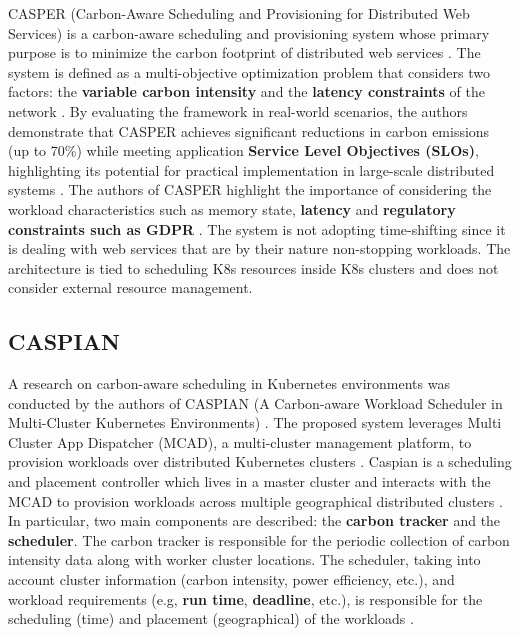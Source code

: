 CASPER (Carbon-Aware Scheduling and Provisioning for Distributed Web Services) is a carbon-aware scheduling and provisioning system whose primary purpose is to minimize the carbon footprint of distributed web services \cite{Souza_2023}.
The system is defined as a multi-objective optimization problem that considers two factors: the \textbf{variable carbon intensity} and the \textbf{latency constraints} of the network \cite{Souza_2023}.
By evaluating the framework in real-world scenarios, the authors demonstrate that CASPER achieves significant reductions in carbon emissions (up to 70\%) while meeting application \textbf{Service Level Objectives (SLOs)}, highlighting its potential for practical implementation in large-scale distributed systems \cite{Souza_2023}.
The authors of CASPER highlight the importance of considering the workload characteristics such as memory state, \textbf{latency} and \textbf{regulatory constraints such as GDPR} \cite{Souza_2023}.
The system is not adopting time-shifting since it is dealing with web services that are by their nature non-stopping workloads. The architecture is tied to scheduling K8s resources inside K8s clusters and does not consider external resource management.

\subsection{CASPIAN}

A research on carbon-aware scheduling in Kubernetes environments was conducted by the authors of CASPIAN (A Carbon-aware Workload Scheduler in Multi-Cluster Kubernetes Environments) \cite{10786568}.
The proposed system leverages Multi Cluster App Dispatcher (MCAD), a multi-cluster management platform, to provision workloads over distributed Kubernetes clusters \cite{10786568}.
Caspian is a scheduling and placement controller which lives in a master cluster and interacts with the MCAD to provision workloads across multiple geographical distributed clusters \cite{10786568}.
In particular, two main components are described: the \textbf{carbon tracker} and the \textbf{scheduler}.
The carbon tracker is responsible for the periodic collection of carbon intensity data along with worker cluster locations.
The scheduler, taking into account cluster information (carbon intensity, power efficiency, etc.), and workload requirements (e.g, \textbf{run time}, \textbf{deadline}, etc.), is responsible for the scheduling (time) and placement (geographical) of the workloads \cite{10786568}.

